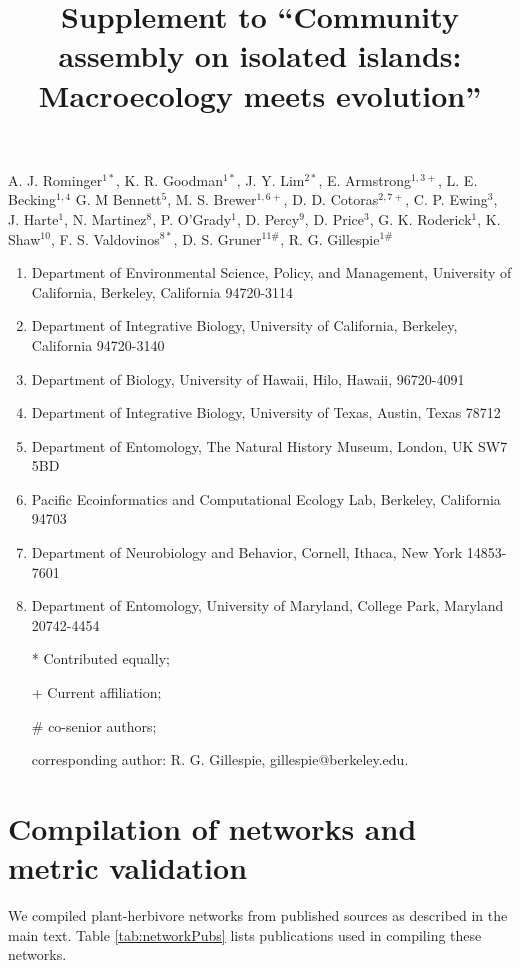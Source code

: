 \documentclass[12pt]{article}
\title{Supplement to ``Community assembly on isolated islands:
  Macroecology meets evolution''}
\author{}
\date{}
\begin{document}
\baselineskip24pt
\maketitle

A. J. Rominger$^{1*}$,
K. R. Goodman$^{1*}$, 
J. Y. Lim$^{2*}$, 
E. Armstrong$^{1,3+}$,
L. E. Becking$^{1,4}$
G. M Bennett$^5$,
M. S. Brewer$^{1,6+}$, 
D. D. Cotoras$^{2,7+}$, 
C. P. Ewing$^3$, 
J. Harte$^1$,
N. Martinez$^8$,
P. O’Grady$^1$,
D. Percy$^9$,
D. Price$^3$,
G. K. Roderick$^1$,
K. Shaw$^10$,
F. S. Valdovinos$^{8*}$, 
D. S. Gruner$^{11\#}$,
R. G. Gillespie$^{1\#}$

\vspace{1em}

\begin{enumerate}
\item Department of Environmental Science, Policy, and Management, University of
  California, Berkeley, California 94720-3114
\item Department of Integrative Biology, University of California, Berkeley,
  California 94720-3140
\item Department of Biology, University of Hawaii, Hilo, Hawaii, 96720-4091
\item Department of Integrative Biology, University of Texas, Austin, Texas 78712
\item Department of Entomology, The Natural History Museum, London, UK SW7 5BD
\item Pacific Ecoinformatics and Computational Ecology Lab, Berkeley,
  California 94703
\item Department of Neurobiology and Behavior, Cornell, Ithaca, New York 14853-7601
\item Department of Entomology, University of Maryland, College Park,
  Maryland 20742-4454
\item[*] Contributed equally;
\item[+] Current affiliation;
\item[\#] co-senior authors; 
\item[] corresponding author: R. G. Gillespie, gillespie@berkeley.edu.
\end{enumerate}

\clearpage


\section{Compilation of networks and metric validation}

We compiled plant-herbivore networks from published sources as
described in the main text.  Table \ref{tab:networkPubs} lists
publications used in compiling these networks.
\end{document}
